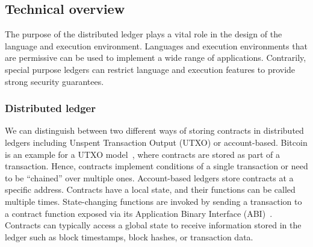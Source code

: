 

\subsection{Technical overview}
The purpose of the distributed ledger plays a vital role in the design of the language and execution environment.
Languages and execution environments that are permissive can be used to implement a wide range of applications. 
Contrarily, special purpose ledgers can restrict language and execution features to provide strong security guarantees.

\subsubsection{Distributed ledger}
We can distinguish between two different ways of storing contracts in distributed ledgers including Unspent Transaction Output (UTXO) or account-based.
Bitcoin is an example for a UTXO model~\cite{Nakamoto2008,Covaci2018}, where contracts are stored as part of a transaction. %
Hence, contracts implement conditions of a single transaction or need to be ``chained'' over multiple ones.
Account-based ledgers store contracts at a specific address.
Contracts have a local state, and their functions can be called multiple times.
State-changing functions are invoked by sending a transaction to a contract function exposed via its Application Binary Interface (ABI)~\cite{Wood2014,Sergey2018,OCamlProSAS2018}.
Contracts can typically access a global state to receive information stored in the ledger such as block timestamps, block hashes, or transaction data. 

